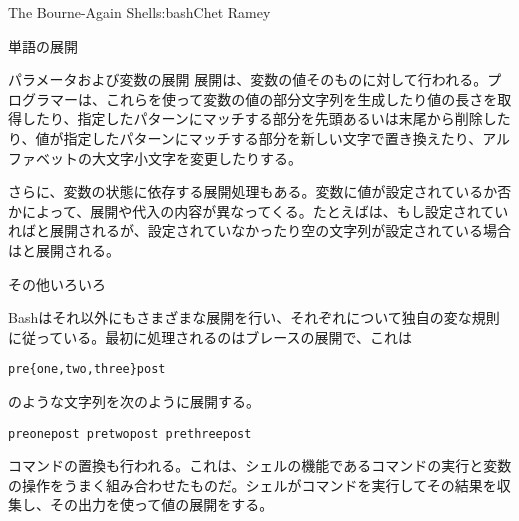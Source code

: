 \begin{aosachapter}{The Bourne-Again Shell}{s:bash}{Chet Ramey}
\begin{aosasect1}{単語の展開}
\begin{aosasect2}{パラメータおよび変数の展開}
展開は、変数の値そのものに対して行われる。プログラマーは、これらを使って変数の値の部分文字列を生成したり値の長さを取得したり、指定したパターンにマッチする部分を先頭あるいは末尾から削除したり、値が指定したパターンにマッチする部分を新しい文字で置き換えたり、アルファベットの大文字小文字を変更したりする。

さらに、変数の状態に依存する展開処理もある。変数に値が設定されているか否かによって、展開や代入の内容が異なってくる。たとえばは、もし設定されていればと展開されるが、設定されていなかったり空の文字列が設定されている場合はと展開される。

\end{aosasect2}

\begin{aosasect2}{その他いろいろ}

Bashはそれ以外にもさまざまな展開を行い、それぞれについて独自の変な規則に従っている。最初に処理されるのはブレースの展開で、これは

\begin{verbatim}
pre{one,two,three}post
\end{verbatim}

\noindent のような文字列を次のように展開する。

\begin{verbatim}
preonepost pretwopost prethreepost
\end{verbatim}

コマンドの置換も行われる。これは、シェルの機能であるコマンドの実行と変数の操作をうまく組み合わせたものだ。シェルがコマンドを実行してその結果を収集し、その出力を使って値の展開をする。


\end{aosasect2}
\end{aosasect1}
\end{aosachapter}

